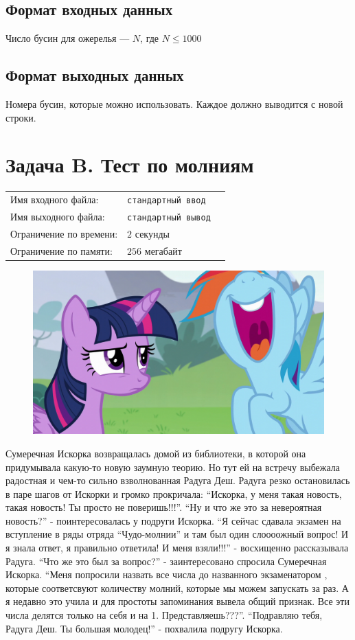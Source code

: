 \documentclass[12pt]{scrartcl}
\newcommand{\inputFile}{стандартный ввод}
\newcommand{\outputFile}{стандартный вывод}
\begin{document}
\subsection*{Формат входных данных}
Число бусин для ожерелья --- $N$, где $N \leq 1000$

\subsection*{Формат выходных данных}
Номера бусин, которые можно использовать. Каждое должно выводится с новой строки. 

\newpage

\section*{Задача B. Тест по молниям}

\begin{tabularx}{\textwidth}{l l X}
    Имя входного файла: & \texttt{\inputFile} \\
    Имя выходного файла: & \texttt{\outputFile} \\
    Ограничение по времени: & $2$ секунды \\
    Ограничение по памяти: & $256$ мегабайт \\
\end{tabularx}


\begin{figure}[h]
	\centering
    \includegraphics[width=0.6\linewidth]{what.png}
\end{figure}

Сумеречная Искорка возвращалась домой из библиотеки, в которой она придумывала какую-то новую заумную теорию. Но тут ей на встречу выбежала радостная и чем-то сильно взволнованная Радуга Деш.
Радуга резко остановилась в паре шагов от Искорки и громко прокричала: ``Искорка, у меня такая новость, такая новость! Ты просто не поверишь!!!''. 
``Ну и что же это за невероятная новость?'' - поинтересовалась у подруги Искорка. ``Я сейчас сдавала экзамен на вступление в ряды отряда ``Чудо-молнии'' и там был один слоооожный вопрос! 
И я знала ответ, я правильно ответила! И меня взяли!!!'' - восхищенно рассказывала Радуга. ``Что же это был за вопрос?'' - заинтересовано спросила Сумеречная Искорка. 
``Меня попросили назвать все числа до названного экзаменатором , которые соответсвуют количеству молний, которые мы можем запускать за раз. А я недавно это учила и для простоты запоминания вывела общий признак.
Все эти числа делятся только на себя и на 1. Представляешь???''. ``Подравляю тебя, Радуга Деш. Ты большая молодец!'' - похвалила подругу Искорка.
\end{document}
